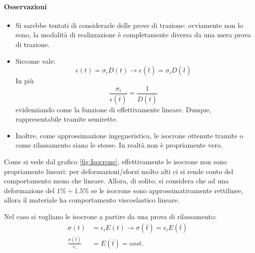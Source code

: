 \paragraph{Osservazioni}
\begin{itemize}
\item Si sarebbe tentati di considerarle delle prove di trazione: ovviamente non lo sono, la modalità di realizzazione è completamente diversa da una mera prova di trazione.
\item Siccome vale:
\begin{equation}
\epsilon(t) = \sigma_iD(t) \rightarrow \epsilon(\bar{t}) = \sigma_iD(\bar{t})
\end{equation}
In più \begin{equation}
\frac{\sigma_i}{\epsilon(\bar{t})} = \frac{1}{D(\bar{t})}
\end{equation}
evidenziando come la funzione di effettivamente lineare. Dunque, rappresentabile tramite semirette.
\item Inoltre, come approssimazione ingegneristica, le isocrone ottenute tramite  o come rilassamento siano le stesse. In realtà non è propriamente vero.
\end{itemize}

Come si vede dal grafico \ref{fig:Isocrone}, effettivamente le isocrone non sono propriamente lineari: per deformazioni/sforzi molto alti ci si rende conto del comportamento meno che lineare.
Allora, di solito, si considera che ad una deformazione del $1\% \div 1.5\%$ se le isocrone sono approssimativamente rettilinee, allora il materiale ha comportamento viscoelastico lineare.

Nel caso si vogliano le isocrone a partire da una prova di rilassamento:
\begin{equation}
\begin{split}
\sigma(t) &= \epsilon_iE(t) \rightarrow \sigma(\bar{t}) = \epsilon_iE(\bar{t})\\
\frac{\sigma(\bar{t})}{\epsilon_i} &= E(\bar{t}) = cost.
\end{split}
\end{equation}

